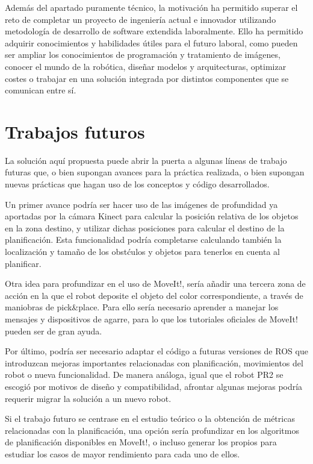 \documentclass[12pt,spanish,chapterprefix, numbers=noenddot]{book}
\numberwithin{equation}{section}
\numberwithin{figure}{section}
\begin{document}
Además del apartado puramente técnico, la motivación ha permitido superar el reto de completar un proyecto de ingeniería actual e innovador utilizando metodología de desarrollo de software extendida laboralmente. Ello ha permitido adquirir conocimientos y habilidades útiles para el futuro laboral, como pueden ser ampliar los conocimientos de programación y tratamiento de imágenes, conocer el mundo de la robótica, diseñar modelos y arquitecturas, optimizar costes o trabajar en una solución integrada por distintos componentes que se comunican entre sí.  

\section{Trabajos futuros}

La solución aquí propuesta puede abrir la puerta a algunas líneas de trabajo futuras que, o bien supongan avances para la práctica realizada, o bien supongan nuevas prácticas que hagan uso de los conceptos y código desarrollados. 

Un primer avance podría ser hacer uso de las imágenes de profundidad ya aportadas por la cámara Kinect para calcular la posición relativa de los objetos en la zona destino, y utilizar dichas posiciones para calcular el destino de la planificación. Esta funcionalidad podría completarse calculando también la localización y tamaño de los obstćulos y objetos para tenerlos en cuenta al planificar. 

Otra idea para profundizar en el uso de MoveIt!, sería añadir una tercera zona de acción en la que el robot deposite el objeto del color correspondiente, a través de maniobras de pick\&place. Para ello sería necesario aprender a manejar los mensajes y dispositivos de agarre, para lo que los tutoriales oficiales de MoveIt! pueden ser de gran ayuda.

Por último, podría ser necesario adaptar el código a futuras versiones de ROS que introduzcan mejoras importantes relacionadas con planificación, movimientos del robot o nueva funcionalidad. De manera análoga, igual que el robot PR2 se escogió por motivos de diseño y compatibilidad, afrontar algunas mejoras podría requerir migrar la solución a un nuevo robot. 

Si el trabajo futuro se centrase en el estudio teórico o la obtención de métricas relacionadas con la planificación, una opción sería profundizar en los algoritmos de planificación disponibles en MoveIt!, o incluso generar los propios para estudiar los casos de mayor rendimiento para cada uno de ellos. 
\printbibliography[heading=bibintoc]
\printindex
\end{document}
